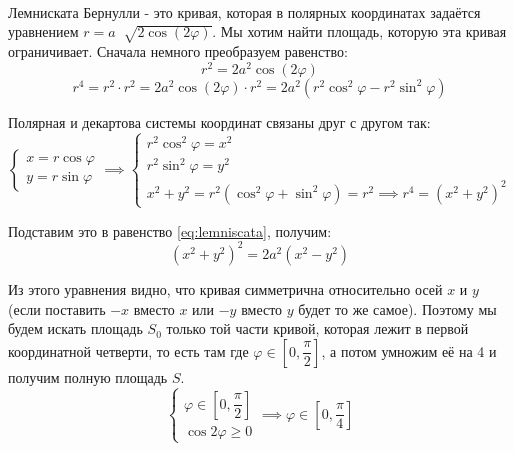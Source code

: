 \documentclass[../main.tex]{subfiles}
\begin{document}
\begin{example}
    
    ~


    Лемниската Бернулли - это кривая, которая в полярных координатах задаётся уравнением \( r = a \;\sqrt[]{2 \cos \left( 2 \varphi \right)}\). 
    Мы хотим найти площадь, которую эта кривая ограничивает. Сначала немного преобразуем равенство:
    \[ r^2 = 2a^2 \cos\left( 2 \varphi \right)\]
    \begin{equation}\label{eq:lemniscata}
        r^4=r^2 \cdot r^2=2a^2\cos\left( 2 \varphi \right)\cdot r^2=2a^2\left( r^2\cos ^2 \varphi - r^2\sin^2 \varphi \right)
    \end{equation}

    Полярная и декартова системы координат связаны друг с другом так: 
    \begin{equation*}
        \begin{cases}
            x=r\cos \varphi \\ 
            y=r\sin \varphi 
        \end{cases}
        \implies 
        \begin{cases}
            r^2\cos^2 \varphi =x^2\\
            r^2\sin^2 \varphi =y^2\\ 
            x^2+y^2=r^2\left( \cos^2 \varphi +\sin^2 \varphi \right)=r^2 \implies r^4=\left( x^2+y^2\right)^2
        \end{cases}
    \end{equation*}

    Подставим это в равенство \ref{eq:lemniscata}, получим: 
    \[ (x^2+y^2)^2=2a^2\left( x^2-y^2\right)\]

    Из этого уравнения видно, что кривая симметрична относительно осей \( x\) и \( y\) (если поставить \( -x\) вместо \( x\) или \( -y\) вместо \( y\) будет то же самое). Поэтому мы будем искать площадь \( S_0\) только той части кривой, которая 
    лежит в первой координатной четверти, то есть там где \( \varphi \in \left[ 0, \dfrac{ \pi}{ 2}\right]\), а потом умножим её на 4 и получим полную площадь \( S\).
    \begin{equation*}
        \begin{cases}
            \varphi \in \left[ 0, \dfrac{ \pi}{ 2}\right]\\
            \cos 2 \varphi \geq 0
        \end{cases}
        \implies 
        \varphi \in \left[ 0, \dfrac{ \pi}{ 4}\right]
    \end{equation*}


\end{example}
\end{document}
